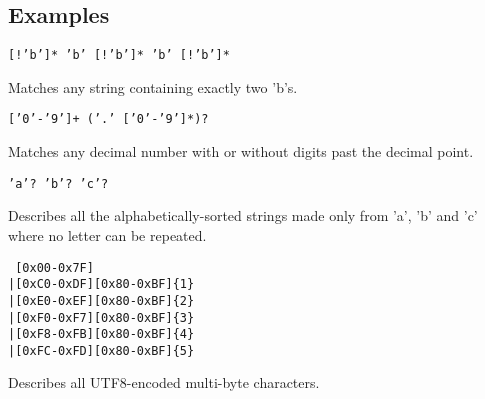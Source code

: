 
\subsection{Examples}
{
	\begin{itemize}
	{
		\item \texttt{[!'b']* 'b' [!'b']* 'b' [!'b']*}
		
			Matches any string containing exactly two 'b's.
		
		\item \texttt{['0'-'9']+ ('.' ['0'-'9']*)?}
		
			Matches any decimal number with or without digits
			past the decimal point.
		
		\item \texttt{'a'? 'b'? 'c'?}
		
			Describes all the alphabetically-sorted strings made only
			from 'a', 'b' and 'c' where no letter can be repeated.
		
		\item
\begin{lstlisting}
 [0x00-0x7F]
|[0xC0-0xDF][0x80-0xBF]{1}
|[0xE0-0xEF][0x80-0xBF]{2}
|[0xF0-0xF7][0x80-0xBF]{3}
|[0xF8-0xFB][0x80-0xBF]{4}
|[0xFC-0xFD][0x80-0xBF]{5}
\end{lstlisting}
			Describes all UTF8-encoded multi-byte characters.
	}
	\end{itemize}
}
